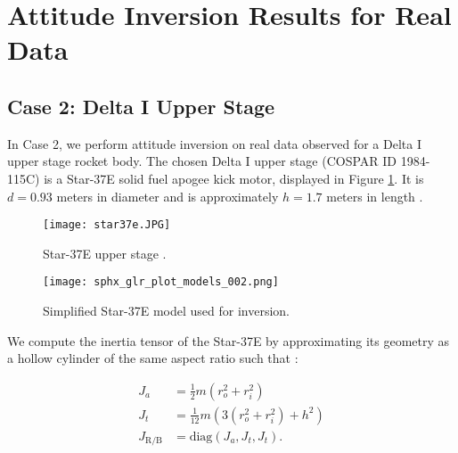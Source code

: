 \documentclass[a4paper,twocolumn]{spaceDebrisC} %
\newcommand{\figbig}[0]{0.5\textwidth}
\newcommand{\figsmall}[0]{0.3\textwidth}
\begin{document}

\section{Attitude Inversion Results for Real Data} \label{sec:real_results}


\subsection{Case 2: Delta I Upper Stage}

In Case 2, we perform attitude inversion on real data observed for a Delta I upper stage rocket body. The chosen Delta I upper stage (COSPAR ID 1984-115C) is a Star-37E \cite{delta3914_astronautix} solid fuel apogee kick motor, displayed in Figure \ref{fig:star37e}. It is $d=0.93$ meters in diameter and is approximately $h=1.7$ meters in length \cite{star37e_astronautix, star37_gunter}.

\begin{figure}[H]
  \centering
  \texttt{[image: star37e.JPG]}
  \caption{Star-37E upper stage \cite{star37_af}.}
  \label{fig:star37e}
\end{figure}

\begin{figure}[H]
  \centering
  \texttt{[image: sphx\_glr\_plot\_models\_002.png]}
  \caption{Simplified Star-37E model used for inversion.}
  \label{fig:star37e_simple}
\end{figure}

We compute the inertia tensor of the Star-37E by approximating its geometry as a hollow cylinder of the same aspect ratio such that \cite{serway2019}:

\begin{align}
 J_a &= \frac{1}{2} m \left(r_o^2+r_i^2\right) \\
 J_t &= \frac{1}{12} m \left(3 \left(r_o^2+r_i^2\right) + h^2\right) \\
 J_\text{R/B} &= \text{diag} \left(J_a, J_t, J_t\right).
\end{align}
\end{document}
